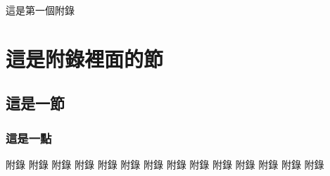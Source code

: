 
\begin{Appx}{這是第一個附錄}
    \section{這是附錄裡面的節}
    \subsection{這是一節}
    \subsubsection{這是一點}
    附錄 附錄 附錄 附錄 附錄 附錄 附錄 附錄 附錄 附錄 附錄 附錄 附錄 附錄
\end{Appx}


